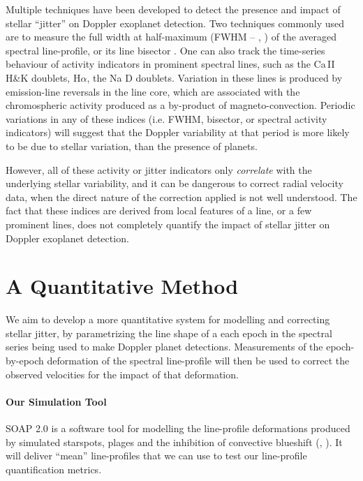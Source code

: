 \documentclass[a4paper]{article}
\begin{document}
Multiple techniques have been developed to detect the presence and impact of stellar ``jitter'' on Doppler exoplanet detection. Two techniques commonly used are to measure the full width at half-maximum (FWHM -- \cite{Queloz2009}, \cite{Hatzes2010}) of the averaged spectral line-profile, or its line bisector \cite{Perryman2011book}. One can also track the time-series behaviour of activity indicators in prominent spectral lines, such as the Ca\,II H\&K doublets, H$\alpha$, the Na D doublets. Variation in these lines is produced by emission-line reversals in the line core, which are associated with the chromospheric activity produced as a by-product of magneto-convection. Periodic variations in any of these indices (i.e. FWHM, bisector, or spectral activity indicators) will suggest that the Doppler variability at that period is more likely to be due to stellar variation, than the presence of planets. 

However, all of these activity or jitter indicators only {\em correlate} with the underlying stellar variability, and it can be dangerous to correct radial velocity data, when the direct nature of the correction applied is not well understood. The fact that these indices are derived from local features of a line, or a few prominent lines, does not completely quantify the impact of stellar jitter on Doppler exoplanet detection. 

\section{A Quantitative Method}
We aim to develop a more quantitative system for modelling and correcting stellar jitter, by parametrizing the line shape of a each epoch in the spectral series being used to make Doppler planet detections. Measurements of the epoch-by-epoch deformation of the spectral line-profile will then be used to correct the observed velocities for the impact of that deformation.

\paragraph{Our Simulation Tool}
SOAP 2.0 is a software tool for modelling the line-profile deformations produced by simulated starspots, plages and the inhibition of convective blueshift (\cite{Boisse2012}, \cite{Dumusque2014}). It will deliver ``mean'' line-profiles that we can use to test our line-profile quantification metrics.
\end{document}
